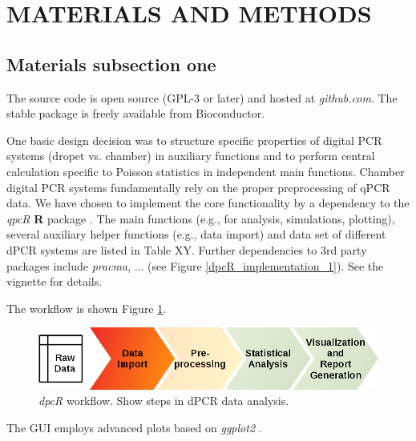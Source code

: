 \documentclass[a4,center,fleqn]{NAR}
\begin{document}
\enlargethispage{-65.1pt}


\section{MATERIALS AND METHODS}

\subsection{Materials subsection one}

The source code is open source (GPL-3 or later) and hosted at \textit{github.com}. The stable package is freely 
available from Bioconductor.

One basic design decision was to structure specific properties of digital PCR 
systems (dropet vs. chamber) in auxiliary functions and to perform central 
calculation specific to Poisson statistics in independent main functions. 
Chamber digital PCR systems fundamentally rely on the proper preprocessing of 
qPCR data. We have chosen to implement the core functionality by a dependency to 
the \textit{qpcR} \textbf{R} package \cite{ritz_qpcr_2008}. The main functions (e.g., for analysis, 
simulations, plotting), several auxiliary helper functions (e.g., data import) 
and data set of different dPCR systems are listed in Table XY. Further 
dependencies to 3rd party packages include \textit{pracma}, ... (see Figure \ref{dpcR_implementation_1}). See the vignette for 
details.

The workflow is shown Figure \ref{workflow}.

\begin{figure}[t]
\begin{center}
\includegraphics[width=17cm]{workflow.png}
\end{center}
\caption{\textit{dpcR} workflow. Show steps in dPCR data analysis.} 
\label{workflow}
\end{figure}

The GUI employs advanced plots based on \textit{ggplot2} \cite{kahle_wickham_2013}.
\end{document}
